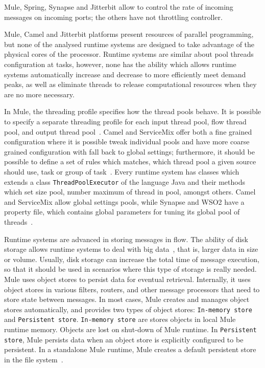 Mule, Spring, Synapse and Jitterbit allow to control the rate of incoming messages on incoming ports; the others have not throttling controller.

Mule, Camel and Jitterbit platforms present resources of parallel programming, but none of the analysed runtime systems are designed to take advantage of the physical cores of the processor.
Runtime systems are similar about pool threads configuration at tasks, however, none has the ability which allows runtime systems automatically increase and decrease to more efficiently meet demand peaks, as well as eliminate threads to release computational resources when they are no more necessary. 

In Mule, the threading profile specifies how the thread pools behave. It is possible to specify a separate threading profile for each input thread pool, flow thread pool, and output thread pool~\cite{Mule}. Camel and ServiceMix offer both a fine grained configuration where it is possible tweak individual pools and have more coarse grained configuration with fall back to global settings; furthermore, it should be possible to define a set of rules which matches, which thread pool a given source should use, task or group of task~\cite{Camel}. Every runtime system has classes which extends a class \texttt{ThreadPoolExecutor} of the language Java and their methods which set size pool, number maximum of thread in pool, amongst others. Camel and ServiceMix allow global settings pools, while Synapse and WSO2 have a property file, which contains global parameters for tuning its global pool of threads~\cite{WSO2}. 

Runtime systems are advanced in storing messages in flow. The ability of disk storage allows runtime systems to deal with big data~\cite{chen2014}, that is, larger data in size or volume. Usually, disk storage can increase the total time of message execution, so that it should be used in scenarios where this type of storage is really needed. Mule uses object stores to persist data for eventual retrieval. Internally, it uses object stores in various filters, routers, and other message processors that need to store state between messages. In most cases, Mule creates and manages object stores automatically, and provides two types of object stores: \texttt{In-memory store} and \texttt{Persistent store}. \texttt{In-memory store} are stores objects in local Mule runtime memory. Objects are lost on shut-down of Mule runtime. In \texttt{Persistent store}, Mule persists data when an object store is explicitly configured to be persistent. In a standalone Mule runtime, Mule creates a default persistent store in the file system~\cite{Mule}. 

